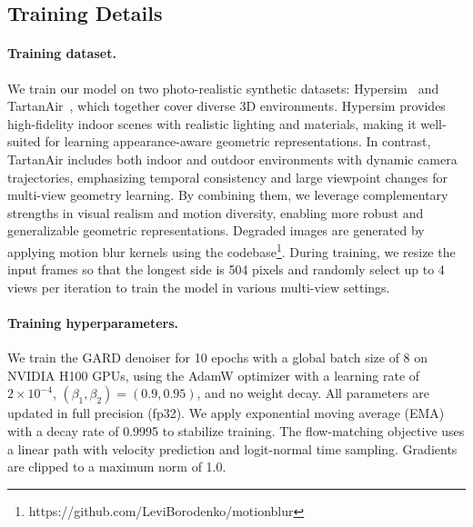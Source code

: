 \subsection{Training Details}

\paragraph{Training dataset.}
We train our model on two photo-realistic synthetic datasets: Hypersim~\cite{roberts2021hypersim} and TartanAir~\cite{wang2020tartanair}, which together cover diverse 3D environments. Hypersim provides high-fidelity indoor scenes with realistic lighting and materials, making it well-suited for learning appearance-aware geometric representations. In contrast, TartanAir includes both indoor and outdoor environments with dynamic camera trajectories, emphasizing temporal consistency and large viewpoint changes for multi-view geometry learning. By combining them, we leverage complementary strengths in visual realism and motion diversity, enabling more robust and generalizable geometric representations. Degraded images are generated by applying motion blur kernels using the codebase\footnote{https://github.com/LeviBorodenko/motionblur}. During training, we resize the input frames so that the longest side is 504 pixels and randomly select up to 4 views per iteration to train the model in various multi-view settings. 

\paragraph{Training hyperparameters.}
We train the GARD denoiser for 10 epochs with a global batch size of 8 on NVIDIA H100 GPUs, using the AdamW optimizer with a learning rate of $2 \times 10^{-4}$, $(\beta_1, \beta_2) = (0.9, 0.95)$, and no weight decay. All parameters are updated in full precision (fp32). We apply exponential moving average (EMA) with a decay rate of 0.9995 to stabilize training. The flow-matching objective uses a linear path with velocity prediction and logit-normal time sampling. Gradients are clipped to a maximum norm of 1.0.


